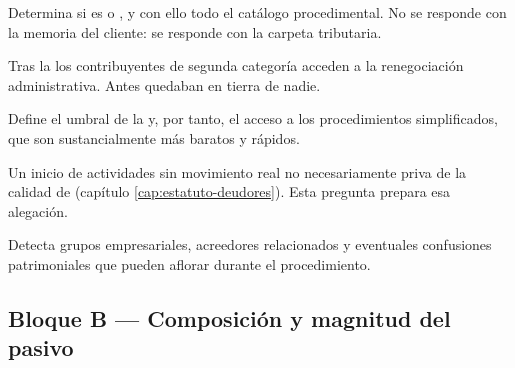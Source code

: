 \begin{cuestionario}
  {Determina si es \empresadeudora{} o \personadeudora{}, y con ello todo el catálogo
  procedimental. No se responde con la memoria del cliente: se responde con la carpeta
  tributaria.}

  {Tras la \Lreforma{} los contribuyentes de segunda categoría acceden a la renegociación
  administrativa. Antes quedaban en tierra de nadie.}

  {Define el umbral de la \Lpyme{} y, por tanto, el acceso a los procedimientos
  simplificados, que son sustancialmente más baratos y rápidos.}

  {Un inicio de actividades sin movimiento real no necesariamente priva de la calidad de
  \personadeudora{} (capítulo \ref{cap:estatuto-deudores}). Esta pregunta prepara esa
  alegación.}

  {Detecta grupos empresariales, acreedores relacionados y eventuales confusiones
  patrimoniales que pueden aflorar durante el procedimiento.}
\end{cuestionario}

\subsection{Bloque B — Composición y magnitud del pasivo}

